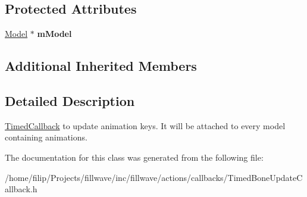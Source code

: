 \subsection*{Protected Attributes}
\begin{DoxyCompactItemize}
\item 
\hyperlink{classflw_1_1flf_1_1Model}{Model} $\ast$ {\bfseries m\+Model}\hypertarget{classflw_1_1flf_1_1TimedBoneUpdateCallback_a71f95af0bd6fcb33f307be6fddc4b2a4}{}\label{classflw_1_1flf_1_1TimedBoneUpdateCallback_a71f95af0bd6fcb33f307be6fddc4b2a4}

\end{DoxyCompactItemize}
\subsection*{Additional Inherited Members}


\subsection{Detailed Description}
\hyperlink{classflw_1_1flf_1_1TimedCallback}{Timed\+Callback} to update animation keys. It will be attached to every model containing animations. 

The documentation for this class was generated from the following file\+:\begin{DoxyCompactItemize}
\item 
/home/filip/\+Projects/fillwave/inc/fillwave/actions/callbacks/Timed\+Bone\+Update\+Callback.\+h\end{DoxyCompactItemize}
